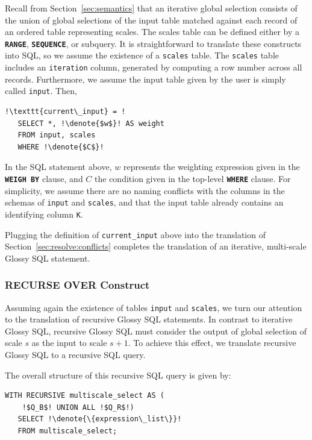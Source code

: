 \documentclass[11pt, oneside]{report}
\newcommand{\denote}[1]{\text{$[\![ $#1$ ]\!]$}}
\begin{document}
{Recall from Section~\ref{sec:semantics} that an iterative global selection consists of the union of global selections of the input table matched against each record of an ordered table representing scales. The scales table can be defined either by a \textbf{\texttt{RANGE}}, \textbf{\texttt{SEQUENCE}}, or subquery. It is straightforward to translate these constructs into SQL, so we assume the existence of a \texttt{scales} table. The \texttt{scales} table includes an \texttt{iteration} column, generated by computing a row number across all records. Furthermore, we assume the input table given by the user is simply called \texttt{input}. Then,

\begin{lstlisting}[escapechar=!]
  !\texttt{current\_input} = !
   SELECT *, !\denote{$w$}! AS weight
   FROM input, scales
   WHERE !\denote{$C$}!   
\end{lstlisting}

In the SQL statement above, $w$ represents the weighting expression given in the \textbf{\texttt{WEIGH BY}} clause, and $C$ the condition given in the top-level \textbf{\texttt{WHERE}} clause. For simplicity, we assume there are no naming conflicts with the columns in the schemas of \texttt{input} and \texttt{scales}, and that the input table already contains an identifying column \texttt{K}. 

Plugging the definition of \texttt{current\_input} above into the translation of Section~\ref{sec:resolve:conflicts} completes the translation of an iterative, multi-scale Glossy SQL statement. 

\subsubsection{RECURSE OVER Construct}
\label{sec:translation:recursive}

Assuming again the existence of tables \texttt{input} and \texttt{scales}, we turn our attention to the translation of recursive Glossy SQL statements. In contrast to iterative Glossy SQL, recursive Glossy SQL must consider the output of global selection of scale $s$ as the input to scale $s+1$. To achieve this effect, we translate recursive Glossy SQL to a recursive SQL query.

The overall structure of this recursive SQL query is given by:

\begin{lstlisting}[escapechar=!]
   WITH RECURSIVE multiscale_select AS (
    !$Q_B$! UNION ALL !$Q_R$!)
   SELECT !\denote{\{expression\_list\}}! 
   FROM multiscale_select;
\end{lstlisting}  

}
\end{document}
